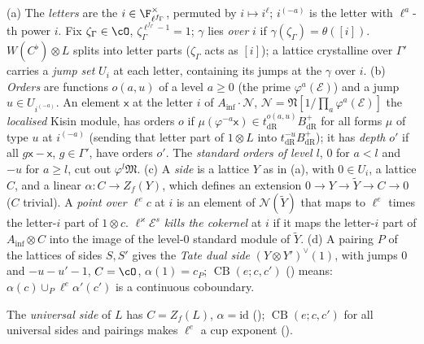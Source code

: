 \begin{definition}
\label{cg-lifting:def:side}
(a) The \emph{letters} are the $i\in\F_{\ell^{f_\Gamma}}^\times$, permuted by $i\mapsto i^\ell$; $i^{(-a)}$ is
the letter with $\ell^a$-th power $i$. Fix $\zeta_\Gamma\in\cO$, $\zeta_\Gamma^{\ell^{f_\Gamma}-1}=1$; $\gamma$ lies
\emph{over} $i$ if $\gamma(\zeta_\Gamma)=\theta([i])$. $W(C^\flat)\otimes L$ splits into letter parts
($\zeta_\Gamma$ acts as $[i]$); a lattice crystalline over $\Gamma'$ carries a \emph{jump set} $U_i$ at each
letter, containing its jumps at the $\gamma$ over $i$.
(b) \emph{Orders} are functions $o(a,u)$ of a level $a\ge0$ (the prime $\varphi^a(\mathcal E)$) and a jump
$u\in U_{i^{(-a)}}$. An element $\mathsf x$ at the letter $i$ of $A_{\inf}\cdot\mathcal N$, $\mathcal N=\mathfrak N[1/\prod_a\varphi^a(\mathcal E)]$ the
\emph{localised} Kisin module, has orders $o$
if $\mu(\varphi^{-a}\mathsf x)\in t_{\mathrm{dR}}^{o(a,u)}B_{\mathrm{dR}}^+$ for all forms $\mu$ of type $u$ at $i^{(-a)}$
(sending that letter part of $1\otimes L$ into $t_{\mathrm{dR}}^{-u}B_{\mathrm{dR}}^+$); it has \emph{depth} $o'$ if
all $g\mathsf x-\mathsf x$, $g\in\Gamma'$, have orders $o'$. The \emph{standard orders of level $l$}, $0$ for $a<l$
and $-u$ for $a\ge l$, cut out $\varphi^l\mathfrak M$.
(c) A \emph{side} is a lattice $Y$ as in (a), with $0\in U_i$, a lattice $C$, and a linear
$\alpha\colon C\to Z_f(Y)$, which defines an extension $0\to Y\to\tilde Y\to C\to0$ ($C$ trivial). A
\emph{point over $\ell^ec$} at $i$ is an element of $\mathcal N(\tilde Y)$ that maps
to $\ell^e$ times the letter-$i$ part of $1\otimes c$. $\ell^\varkappa\mathcal E^s$ \emph{kills the cokernel}
at $i$ if it maps the letter-$i$ part of $A_{\inf}\otimes C$ into the image of the level-$0$
standard module of $\tilde Y$.
(d) A pairing $P$ of the lattices of sides $S,S'$ gives the \emph{Tate dual side}
$(Y\otimes Y')^\vee(1)$, with jumps $0$ and $-u-u'-1$, $C=\cO$, $\alpha(1)=c_P$;
$\operatorname{CB}(e;c,c')$ () means:
$\alpha(c)\cup_P\ell^e\alpha'(c')$ is a continuous coboundary.
\end{definition}

The \emph{universal side} of $L$ has $C=Z_f(L)$, $\alpha=\mathrm{id}$
(); $\operatorname{CB}(e;c,c')$ for all universal sides and
pairings makes $\ell^e$ a cup exponent
().

